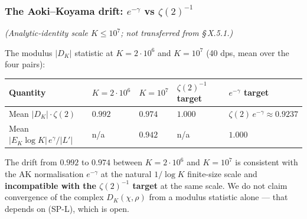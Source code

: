 \subsubsection{The Aoki--Koyama drift: \(e^{-\gamma}\) vs \(\zeta(2)^{-1}\)}

\emph{(Analytic-identity scale \(K \le 10^{7}\); not transferred from \S\,X.5.1.)}

The modulus \(|D_K|\) statistic at \(K = 2 \cdot 10^{6}\) and \(K = 10^{7}\)
(40 dps, mean over the four pairs):

{\def\LTcaptype{none} %
\begin{longtable}[]{@{}
  >{\raggedright\arraybackslash}p{}
  >{\raggedleft\arraybackslash}p{}
  >{\raggedleft\arraybackslash}p{}
  >{\raggedleft\arraybackslash}p{}
  >{\raggedleft\arraybackslash}p{}@{}}
\toprule\noalign{}
\begin{minipage}[b]{\linewidth}\raggedright
Quantity
\end{minipage} & \begin{minipage}[b]{\linewidth}\raggedleft
\(K = 2 \cdot 10^{6}\)
\end{minipage} & \begin{minipage}[b]{\linewidth}\raggedleft
\(K = 10^{7}\)
\end{minipage} & \begin{minipage}[b]{\linewidth}\raggedleft
\(\zeta(2)^{-1}\) target
\end{minipage} & \begin{minipage}[b]{\linewidth}\raggedleft
\(e^{-\gamma}\) target
\end{minipage} \\
\midrule\noalign{}
\endhead
\bottomrule\noalign{}
\endlastfoot
Mean \(|D_K| \cdot \zeta(2)\) & \(0.992\) & \(0.974\) & \(1.000\) & \(\zeta(2)\,e^{-\gamma} \approx 0.9237\) \\
Mean \(|E_K \log K|\,e^{\gamma}/|L'|\) & n/a & \(0.942\) & n/a & \(1.000\) \\
\end{longtable}
}

The drift from \(0.992\) to \(0.974\) between \(K = 2 \cdot 10^{6}\) and
\(K = 10^{7}\) is consistent with the AK normalisation \(e^{-\gamma}\)
at the natural \(1/\log K\) finite-size scale and \textbf{incompatible with
the \(\zeta(2)^{-1}\) target} at the same scale. We do not claim
convergence of the complex \(D_K(\chi,\rho)\) from a modulus statistic
alone --- that depends on (SP-L), which is open.

